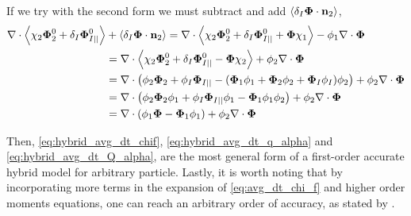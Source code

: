 If we try with the second form we must subtract and add $\left<\delta_I \bm{\Phi} \cdot \textbf{n}_2\right>$, 
\begin{align*}
    \mathbf{\nabla} \cdot \left<\chi_2 \mathbf{\Phi}_2^0 + \delta_I \mathbf{\Phi}_{I||}^0\right>
    & + \left<\delta_I \bm{\Phi} \cdot \textbf{n}_2\right>
    =
    \mathbf{\nabla} \cdot \left<\chi_2 \mathbf{\Phi}_2^0 + \delta_I \mathbf{\Phi}_{I||}^0 + \bm{\Phi} \chi_1\right> 
     - \phi_1 \mathbf{\nabla} \cdot \bm{\Phi}\\
    &=
    \mathbf{\nabla} \cdot \left<\chi_2 \mathbf{\Phi}_2^0 + \delta_I \mathbf{\Phi}_{I||}^0 - \bm{\Phi} \chi_2\right> 
     + \phi_2 \mathbf{\nabla} \cdot \bm{\Phi}\\
    &=
    \mathbf{\nabla} \cdot \left(\phi_2 \mathbf{\Phi}_2 + \phi_I \mathbf{\Phi}_{I||} - (\bm{\Phi}_1 \phi_1 + \bm{\Phi}_2 \phi_2  + \bm{\Phi}_I \phi_I   ) \phi_2 \right) 
     + \phi_2 \mathbf{\nabla} \cdot \bm{\Phi}\\
    &=
    \mathbf{\nabla} \cdot \left(\phi_2 \mathbf{\Phi}_2 \phi_1 + \phi_I \mathbf{\Phi}_{I||} \phi_1 - \bm{\Phi}_1 \phi_1 \phi_2 \right) 
     + \phi_2 \mathbf{\nabla} \cdot \bm{\Phi}\\
    &=
    \mathbf{\nabla} \cdot \left(\phi_1 \mathbf{\Phi} - \bm{\Phi}_1 \phi_1 \right) 
     + \phi_2 \mathbf{\nabla} \cdot \bm{\Phi}\\
\end{align*}



Then, \ref{eq:hybrid_avg_dt_chif}, \ref{eq:hybrid_avg_dt_q_alpha} and \ref{eq:hybrid_avg_dt_Q_alpha}, are the most general form of a first-order accurate hybrid model for arbitrary particle. 
Lastly, it is worth noting that by incorporating more terms in the expansion of \ref{eq:avg_dt_chi_f} and higher order moments equations, one can reach an arbitrary order of accuracy, as stated by \citet{zhang1997momentum}. 

